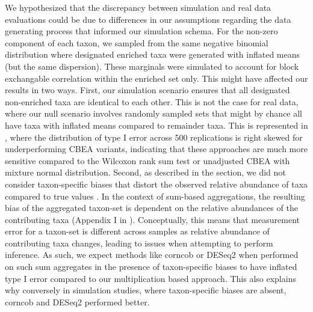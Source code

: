 We hypothesized that the discrepancy between simulation and real data evaluations could be due to differences in our assumptions regarding the data generating process that informed our simulation schema. For the non-zero component of each taxon, we sampled from the same negative binomial distribution where designated enriched taxa were generated with inflated means (but the same dispersion). These marginals were simulated to account for block exchangable correlation within the enriched set only. This might have affected our results in two ways. First, our simulation scenario ensures that all designated non-enriched taxa are identical to each other. This is not the case for real data, where our null scenario involves randomly sampled sets that might by chance all have taxa with inflated means compared to remainder taxa. This is represented in , where the distribution of type I error across 500 replications is right skewed for underperforming CBEA variants, indicating that these approaches are much more sensitive compared to the Wilcoxon rank sum test or unadjusted CBEA with mixture normal distribution. Second, as described in the  section, we did not consider taxon-specific biases that distort the observed relative abundance of taxa compared to true values \cite{mclaren2019}. In the context of sum-based aggregations, the resulting bias of the aggregated taxon-set is dependent on the relative abundances of the contributing taxa (Appendix I in \cite{mclaren2019}). Conceptually, this means that measurement error for a taxon-set is different across samples as relative abundance of contributing taxa changes, leading to issues when attempting to perform inference. As such, we expect methods like corncob or DESeq2 when performed on such sum aggregates in the presence of taxon-specific biases to have inflated type I error compared to our multiplication based approach. This also explains why conversely in simulation studies, where taxon-specific biases are absent, corncob and DESeq2 performed better. 
